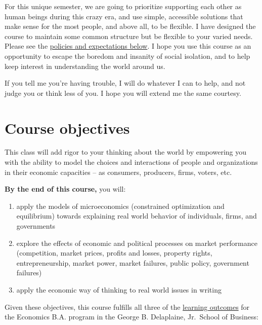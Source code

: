 \documentclass{article}
\providecommand{\tightlist}{%
  \setlength{\itemsep}{0pt}\setlength{\parskip}{0pt}}
\begin{document}
For this unique semester, we are going to prioritize supporting each
other as human beings during this crazy era, and use simple, accessible
solutions that make sense for the most people, and above all, to be
flexible. I have designed the course to maintain some common structure
but be flexible to your varied needs. Please see the
\protect\hyperlink{policies-and-expectations}{policies and expectations
below}. I hope you use this course as an opportunity to escape the
boredom and insanity of social isolation, and to help keep interest in
understanding the world around us.

If you tell me you're having trouble, I will do whatever I can to help,
and not judge you or think less of you. I hope you will extend me the
same courtesy.

\hypertarget{course-objectives}{%
\section*{Course objectives}\label{course-objectives}}

This class will add rigor to your thinking about the world by empowering
you with the ability to model the choices and interactions of people and
organizations in their economic capacities -- as consumers, producers,
firms, voters, etc.

\textbf{By the end of this course,} you will:

\begin{enumerate}
\def\labelenumi{\arabic{enumi}.}
\tightlist
\item
  apply the models of microeconomics (constrained optimization and
  equilibrium) towards explaining real world behavior of individuals,
  firms, and governments
\item
  explore the effects of economic and political processes on market
  performance (competition, market prices, profits and losses, property
  rights, entrepreneurship, market power, market failures, public
  policy, government failures)
\item
  apply the economic way of thinking to real world issues in writing
\end{enumerate}

Given these objectives, this course fulfills all three of the
\href{https://www.hood.edu/academics/departments/george-b-delaplaine-jr-school-business/student-learning-outcomes}{learning
outcomes} for the Economics B.A. program in the George B. Delaplaine,
Jr.~School of Business:
\end{document}
